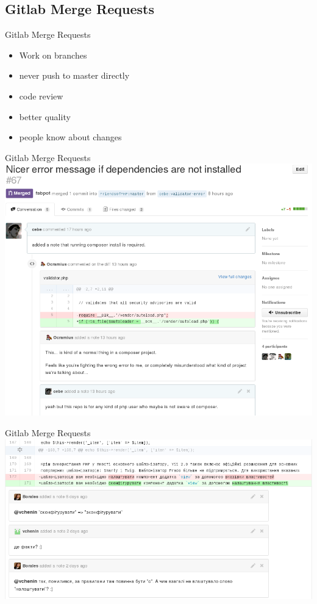 \documentclass{beamer}
\begin{document}
\subsection{Gitlab Merge Requests}
\begin{frame}{Gitlab Merge Requests}

	\begin{itemize}
		\item Work on branches \pause
		\item never push to master directly \pause
		\item code review \pause
		\item better quality \pause
		\item people know about changes
	\end{itemize}
\end{frame}
\begin{frame}{Gitlab Merge Requests}
	\includegraphics[width=\textwidth]{images/gitlab_pr}
\end{frame}

\begin{frame}{Gitlab Merge Requests}
	\includegraphics[width=\textwidth]{images/gitlab_pr_comment}
\end{frame}
\end{document}
